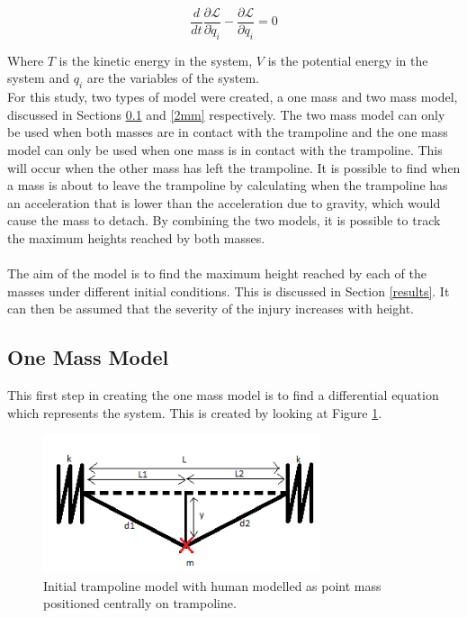 \begin{equation}
\frac{d}{dt}\frac{\partial \mathcal{L} }{\partial \dot q_i} - \frac{\partial \mathcal{L} }{\partial q_i} = 0
\end{equation}\label{lagrangeeq2}

\noindent Where $T$ is the kinetic energy in the system, $V$ is the potential energy in the system and $q_i$ are the variables of the system. \\

\noindent For this study, two types of model were created, a one mass and two mass model, discussed in Sections \ref{1mm} and \ref{2mm} respectively. The two mass model can only be used when both masses are in contact with the trampoline and the one mass model can only be used when one mass is in contact with the trampoline. This will occur when the other mass has left the trampoline. It is possible to find when a mass is about to leave the trampoline by calculating when the trampoline has an acceleration that is lower than the acceleration due to gravity, which would cause the mass to detach. %
By combining the two models, it is possible to track the maximum heights reached by both masses. 
\\
\\
\noindent The aim of the model is to find the maximum height reached by each of the masses under different initial conditions. This is discussed in Section \ref{results}. It can then be assumed that the severity of the injury increases with height.

\subsection{One Mass Model}\label{1mm}
\noindent This first step in creating the one mass model is to find a differential equation which represents the system. This is created by looking at Figure \ref{fig:system1}.

\begin{figure}[H]
	\centering
	\includegraphics[width=0.6\linewidth, height=1.6in]{system1.png}
	\caption{Initial trampoline model with human modelled as point mass positioned centrally on trampoline.}\label{fig:system1}
\end{figure}

